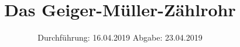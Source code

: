 

\subject{Nr.703}
\title{Das Geiger-Müller-Zählrohr}
\date{%
  Durchführung: 16.04.2019
  \hspace{3em}
  Abgabe: 23.04.2019
}



\maketitle
\thispagestyle{empty}
\tableofcontents
\newpage






\printbibliography{}


